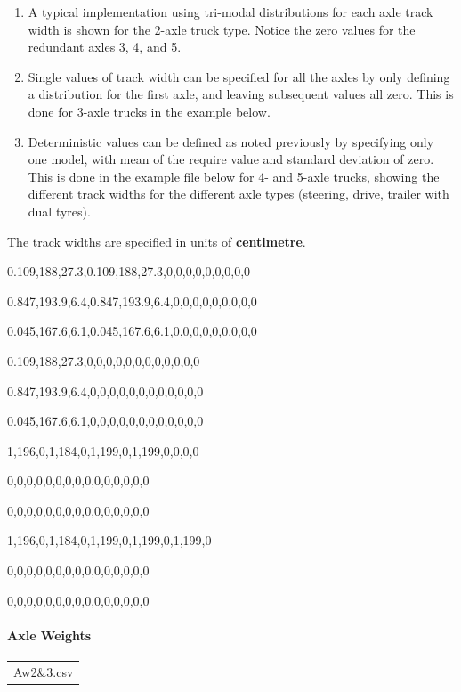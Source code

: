 \documentclass[
]{article}
\begin{document}
\begin{enumerate}
\def\labelenumi{\arabic{enumi}.}
\item
  A typical implementation using tri-modal distributions for each axle
  track width is shown for the 2-axle truck type. Notice the zero values
  for the redundant axles 3, 4, and 5.
\item
  Single values of track width can be specified for all the axles by
  only defining a distribution for the first axle, and leaving
  subsequent values all zero. This is done for 3-axle trucks in the
  example below.
\item
  Deterministic values can be defined as noted previously by specifying
  only one model, with mean of the require value and standard deviation
  of zero. This is done in the example file below for 4- and 5-axle
  trucks, showing the different track widths for the different axle
  types (steering, drive, trailer with dual tyres).
\end{enumerate}

The track widths are specified in units of \textbf{centimetre}.

0.109,188,27.3,0.109,188,27.3,0,0,0,0,0,0,0,0,0

0.847,193.9,6.4,0.847,193.9,6.4,0,0,0,0,0,0,0,0,0

0.045,167.6,6.1,0.045,167.6,6.1,0,0,0,0,0,0,0,0,0

0.109,188,27.3,0,0,0,0,0,0,0,0,0,0,0,0

0.847,193.9,6.4,0,0,0,0,0,0,0,0,0,0,0,0

0.045,167.6,6.1,0,0,0,0,0,0,0,0,0,0,0,0

1,196,0,1,184,0,1,199,0,1,199,0,0,0,0

0,0,0,0,0,0,0,0,0,0,0,0,0,0,0

0,0,0,0,0,0,0,0,0,0,0,0,0,0,0

1,196,0,1,184,0,1,199,0,1,199,0,1,199,0

0,0,0,0,0,0,0,0,0,0,0,0,0,0,0

0,0,0,0,0,0,0,0,0,0,0,0,0,0,0

\paragraph*{\texorpdfstring{\hfill\break
Axle Weights}{ Axle Weights}}\label{axle-weights}

\begin{longtable}[]{@{}
  >{\centering\arraybackslash}p{}@{}}
\toprule\noalign{}
\endhead
\bottomrule\noalign{}
\endlastfoot
Aw2\&3.csv \\
\end{longtable}
\end{document}
